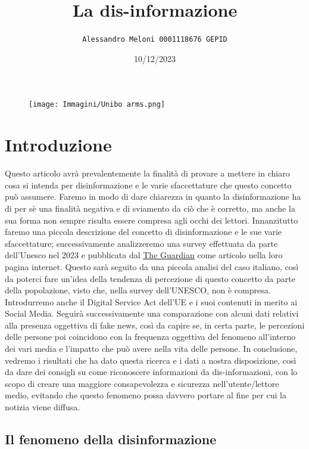 \documentclass{article}
\title{\Huge\textbf{La dis-informazione}}
\author{\texttt{Alessandro Meloni 0001118676 GEPID}}
\date{10/12/2023}
\begin{document}
\begin{figure}
    \centering
    \texttt{[image: Immagini/Unibo arms.png]}
\end{figure}
    \maketitle
\centering\tableofcontents
\newpage \section{Introduzione}
\flushleft
\begin{justify}
    Questo articolo avrà prevalentemente la finalità di provare a mettere in chiaro cosa si intenda per disinformazione e le varie sfaccettature che questo concetto può assumere.
    Faremo in modo di dare chiarezza in quanto la disinformazione ha di per sè una finalità negativa e di sviamento da ciò che è corretto, ma anche la sua forma non sempre risulta essere compresa agli occhi dei lettori.
    Innanzitutto faremo una piccola descrizione del concetto di disinformazione e le sue varie sfaccettature; successivamente analizzeremo una survey effettuata da parte dell'Unesco nel 2023 e pubblicata dal \href{https://www.theguardian.com/technology/2023/nov/07/85-of-people-worry-about-online-disinformation-global-survey-finds}{The Guardian}\label{:articolo} come articolo nella loro pagina internet. Questo sarà seguito da una piccola analisi del caso italiano, così da poterci fare un'idea della tendenza di percezione di questo concetto da parte della popolazione, visto che, nella survey dell'UNESCO, non è compresa.
    Introdurremo anche il Digital Service Act dell'UE e i suoi contenuti in merito ai Social Media.
    Seguirà successivamente una comparazione con alcuni dati relativi alla presenza oggettiva di fake news, così da capire se, in certa parte, le percezioni delle persone poi coincidono con la frequenza oggettiva del fenomeno all'interno dei vari media e l'impatto che può avere nella vita delle persone.
    In conclusione, vedremo i risultati che ha dato questa ricerca e i dati a nostra disposizione, così da dare dei consigli su come riconoscere informazioni da dis-informazioni, con lo scopo di creare una maggiore consapevolezza e sicurezza nell'utente/lettore medio, evitando che questo fenomeno possa davvero portare al fine per cui la notizia viene diffusa.
\end{justify}

\begin{center}
\section{Il fenomeno della disinformazione}
\end{center}
\end{document}
